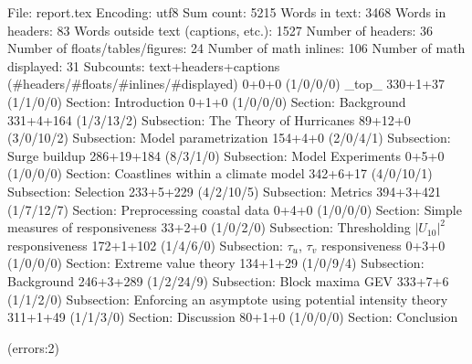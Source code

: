 
File: report.tex
Encoding: utf8
Sum count: 5215
Words in text: 3468
Words in headers: 83
Words outside text (captions, etc.): 1527
Number of headers: 36
Number of floats/tables/figures: 24
Number of math inlines: 106
Number of math displayed: 31
Subcounts:
  text+headers+captions (#headers/#floats/#inlines/#displayed)
  0+0+0 (1/0/0/0) _top_
  330+1+37 (1/1/0/0) Section: Introduction
  0+1+0 (1/0/0/0) Section: Background
  331+4+164 (1/3/13/2) Subsection: The Theory of Hurricanes
  89+12+0 (3/0/10/2) Subsection: Model parametrization
  154+4+0 (2/0/4/1) Subsection: Surge buildup
  286+19+184 (8/3/1/0) Subsection: Model Experiments
  0+5+0 (1/0/0/0) Section: Coastlines within a climate model
  342+6+17 (4/0/10/1) Subsection: Selection
  233+5+229 (4/2/10/5) Subsection: Metrics
  394+3+421 (1/7/12/7) Section: Preprocessing coastal data
  0+4+0 (1/0/0/0) Section: Simple measures of responsiveness
  33+2+0 (1/0/2/0) Subsection: Thresholding $|U_{10}|^2$ responsiveness
  172+1+102 (1/4/6/0) Subsection: $\tau_u$, $\tau_v$ responsiveness
  0+3+0 (1/0/0/0) Section: Extreme value theory
  134+1+29 (1/0/9/4) Subsection: Background
  246+3+289 (1/2/24/9) Subsection: Block maxima GEV
  333+7+6 (1/1/2/0) Subsection: Enforcing an asymptote using potential intensity theory 
  311+1+49 (1/1/3/0) Section: Discussion
  80+1+0 (1/0/0/0) Section: Conclusion

(errors:2)
